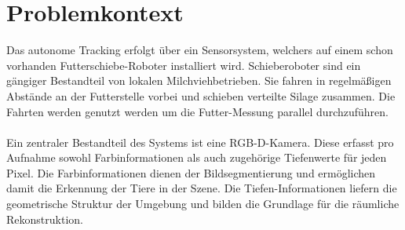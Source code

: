 \documentclass[12pt,DIV=15,BCOR=15mm,twoside,headsepline,abstract=true,listof=totoc,bibliography=totoc]{scrreprt}
\theoremstyle{remark}    %
\begin{document}
    \section{Problemkontext} \label{sec:problem}
    Das autonome Tracking erfolgt über ein Sensorsystem, welchers auf einem schon vorhanden Futterschiebe-Roboter installiert wird. Schieberoboter sind ein 
    gängiger Bestandteil von lokalen Milchviehbetrieben. Sie fahren in regelmäßigen Abstände an der Futterstelle vorbei und schieben verteilte Silage zusammen. 
    Die Fahrten werden  genutzt werden um die Futter-Messung parallel durchzuführen.\\\\
    Ein zentraler Bestandteil des Systems ist eine \ac{RGB-D}-Kamera.
    Diese erfasst pro Aufnahme sowohl Farbinformationen als auch zugehörige Tiefenwerte für jeden Pixel.
    Die Farbinformationen dienen der Bildsegmentierung und ermöglichen damit die Erkennung der Tiere in der Szene.
    Die Tiefen-Informationen liefern die geometrische Struktur der Umgebung und bilden die Grundlage für die räumliche Rekonstruktion.
\end{document}
